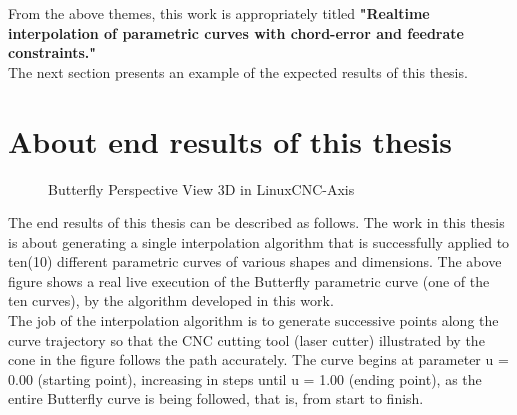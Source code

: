 \noindent
From the above themes, this work is appropriately titled \textbf{"Realtime interpolation of parametric curves with chord-error and feedrate constraints."} \\

\noindent
The next section presents an example of the expected results of this thesis.

\clearpage
\pagebreak

\section{About end results of this thesis} \label{sec-About end results of this thesis}

\begin{figure}
	\caption  {Butterfly Perspective View 3D in LinuxCNC-Axis}
	\label{img-Chap1-Butterfly-Perspective-View-3D-from-LinuxCNC-Axis.png}
	\centering
{}
\end{figure}	

The end results of this thesis can be described as follows. The work in this thesis is about generating a single interpolation algorithm that is successfully applied to ten(10) different parametric curves of various shapes and dimensions. The above figure shows a real live execution of the Butterfly parametric curve (one of the ten curves), by the algorithm developed in this work. \\

The job of the interpolation algorithm is to generate successive points along the curve trajectory so that the CNC cutting tool (laser cutter) illustrated by the cone in the figure follows the path accurately. The curve begins at parameter u = 0.00 (starting point), increasing in steps until u = 1.00 (ending point), as the entire Butterfly curve is being followed, that is, from start to finish. \\


